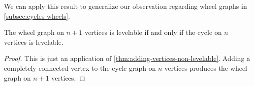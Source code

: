 We can apply this result to generalize our observation regarding wheel graphs in \autoref{subsec:cycles-wheels}. 

\begin{corollary}
The wheel graph on $n+1$ vertices is levelable if and only if the cycle on $n$ vertices is levelable.
\end{corollary}

\begin{proof}
This is just an application of \autoref{thm:adding-vertices-non-levelable}. Adding a completely connected vertex to the cycle graph on $n$ vertices produces the wheel graph on $n+1$ vertices.
\end{proof}